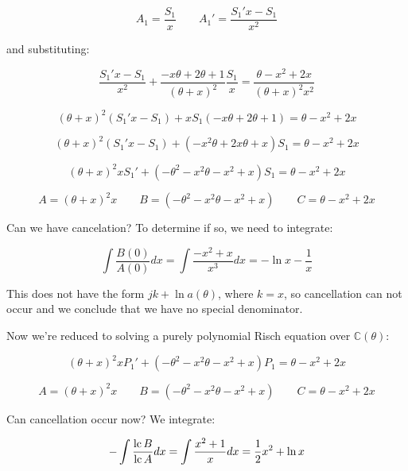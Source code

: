 $$A_1 = \frac{S_1}{x} \qquad A_1' = \frac{S_1' x - S_1}{x^2}$$

and substituting:

$$\frac{S_1' x - S_1}{x^2} + \frac{-x\theta + 2 \theta +1}{(\theta+x)^2} \frac{S_1}{x} = \frac{\theta - x^2 + 2x}{(\theta + x)^2 x^2}$$

$$(\theta+x)^2 (S_1' x - S_1) + x S_1(-x\theta + 2 \theta +1) = \theta - x^2 + 2x$$

$$(\theta+x)^2 (S_1' x - S_1) + (-x^2\theta + 2 x \theta + x) S_1 = \theta - x^2 + 2x$$

$$(\theta+x)^2 x S_1' + (-\theta^2 -x^2\theta - x^2 + x) S_1 = \theta - x^2 + 2x$$

$$A = (\theta+x)^2 x \qquad B = (-\theta^2 -x^2\theta - x^2 + x) \qquad C = \theta - x^2 + 2x$$

Can we have cancelation?  To determine if so, we need to integrate:

$$\int \frac{B(0)}{A(0)} dx = \int \frac{-x^2+x}{x^3} dx = - \ln x - \frac{1}{x}$$

This does not have the form $jk + \ln a(\theta)$, where $k=x$, so cancellation
can not occur and we conclude that we have no special denominator.

Now we're reduced to solving a purely polynomial Risch equation over ${\mathbb C}(\theta)$:

$$(\theta+x)^2 x P_1' + (-\theta^2 -x^2\theta - x^2 + x) P_1 = \theta - x^2 + 2x$$

$$A = (\theta+x)^2 x \qquad B = (-\theta^2 -x^2\theta - x^2 + x) \qquad C = \theta - x^2 + 2x$$

Can cancellation occur now?  We integrate:

$$- \int \frac{{\rm lc\,} B}{{\rm lc\,} A} dx = \int \frac{x^2+1}{x} dx = \frac{1}{2}x^2 + \ln x$$



\endexample

